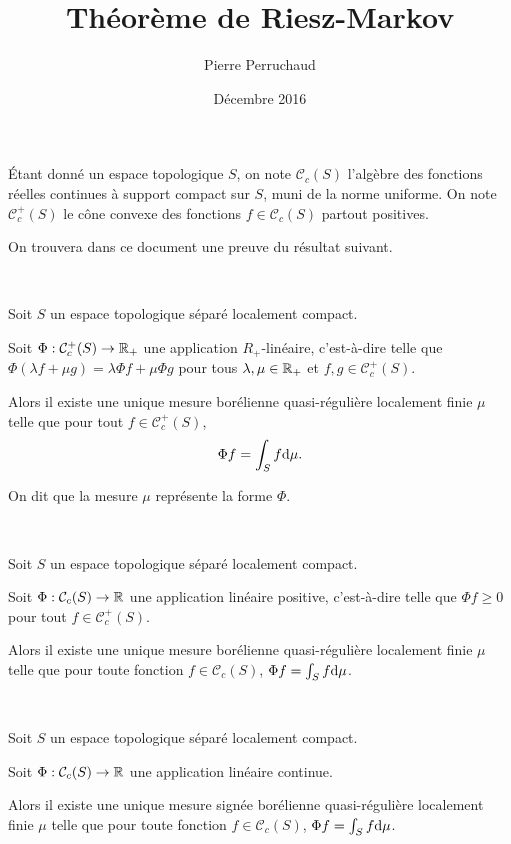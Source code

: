 \documentclass{article}
\title{Théorème de Riesz-Markov}
\author{Pierre Perruchaud}
\date{Décembre 2016}
\begin{document}
\maketitle

Étant donné un espace topologique $S$, on note $\mathcal C_c(S)$ l'algèbre des fonctions réelles continues à support compact sur $S$, muni de la norme uniforme. On note $\mathcal C_c^+(S)$ le cône convexe des fonctions $f\in\mathcal C_c(S)$ partout positives.

On trouvera dans ce document une preuve du résultat suivant.

\begin{Thm}~
\label{ThRM}

Soit $S$ un espace topologique séparé localement compact.

Soit $\Phi:\mathcal C_c^+(S)\to\mathbb{R}_+$ une application $R_+$-linéaire, c'est-à-dire telle que $\Phi(\lambda f+\mu g)=\lambda\Phi f+\mu\Phi g$ pour tous $\lambda,\mu\in\mathbb{R}_+$ et $f,g\in\mathcal C_c^+(S)$. 

Alors il existe une unique mesure borélienne quasi-régulière localement finie $\mu$ telle que pour tout $f\in\mathcal C_c^+(S)$,
$$\Phi f=\int_Sf\mathrm{d}\mu\text.$$
\end{Thm}

On dit que la mesure $\mu$ représente la forme $\Phi$.

\begin{Cor}~
\label{CoPositif}

Soit $S$ un espace topologique séparé localement compact.

Soit $\Phi:\mathcal C_c(S)\to\mathbb{R}$ une application linéaire positive, c'est-à-dire telle que $\Phi f\geq0$ pour tout $f\in\mathcal C_c^+(S)$.

Alors il existe une unique mesure borélienne quasi-régulière localement finie $\mu$ telle que pour toute fonction $f\in\mathcal C_c(S)$, $\Phi f=\int_Sf\mathrm{d}\mu$.
\end{Cor}

\begin{Cor}~
\label{CoBorne}

Soit $S$ un espace topologique séparé localement compact.

Soit $\Phi:\mathcal C_c(S)\to\mathbb{R}$ une application linéaire continue.

Alors il existe une unique mesure signée borélienne quasi-régulière localement finie $\mu$ telle que pour toute fonction $f\in\mathcal C_c(S)$, $\Phi f=\int_Sf\mathrm{d}\mu$.
\end{Cor}
\end{document}
